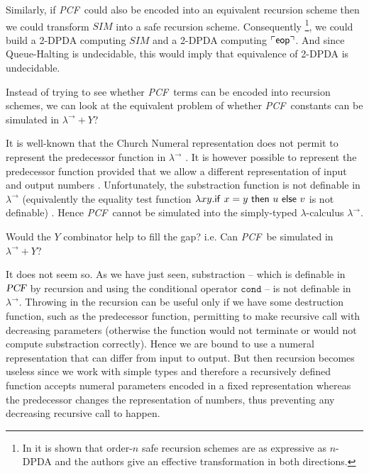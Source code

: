 \documentclass{article}
\newcommand{\encode}[1]{\ulcorner #1 \urcorner}
\newcommand\eop{{\sf eop}}
\newcommand\pcf{\textsl{PCF}}
\newcommand\pcfcond{\texttt{cond}}
\begin{document}
Similarly, if \pcf\ could also be encoded into an equivalent recursion scheme then we could transform $SIM$ into a safe recursion scheme. Consequently \footnote{In \cite{KNU02} it is shown that order-$n$ safe recursion schemes are as expressive as $n$-DPDA and the authors give an effective transformation in both directions.}, we could build a 2-DPDA computing $SIM$ and a 2-DPDA computing $\encode{\eop}$. And since Queue-Halting is undecidable, this would imply that equivalence of 2-DPDA is undecidable.

Instead of trying to see whether \pcf\ terms can be encoded into recursion schemes, we can look at the equivalent problem of whether \pcf\ constants can be simulated in $\lambda^\rightarrow + Y$?

It is well-known that the Church Numeral representation does not permit
to represent the predecessor function in $\lambda^\rightarrow$ \cite{DBLP:journals/jacm/FortuneLO83}. It is however possible to represent the predecessor function provided that we allow a different representation of input and output numbers \cite{DBLP:journals/jacm/FortuneLO83}.
Unfortunately, the substraction function is not definable in $\lambda^\rightarrow$ (equivalently  the equality test function $\lambda xy. {\sf if\ } x = y {\sf\ then\ } u {\sf\ else\ } v$ is not definable) \cite{DBLP:journals/jacm/FortuneLO83}.
Hence \pcf\ cannot be simulated into the simply-typed $\lambda$-calculus $\lambda^\rightarrow$.

Would the $Y$ combinator help to fill the gap? i.e. Can \pcf\ be simulated in  $\lambda^\rightarrow + Y$?  

It does not seem so. As we have just seen, substraction -- which is definable in $\pcf$  by recursion and using the conditional operator $\pcfcond$ -- is not definable in $\lambda^\rightarrow$. Throwing in the recursion
can  be useful only if we have some destruction function, such as the predecessor function, permitting to make recursive call with decreasing parameters (otherwise the function would not terminate or would not compute substraction correctly). Hence we are bound to use a numeral representation
that can differ from input to output. But then recursion becomes useless since we work with simple types and therefore a recursively defined function accepts numeral parameters encoded in a fixed representation whereas the predecessor changes the representation of numbers, thus preventing any decreasing recursive call to happen.
\end{document}

